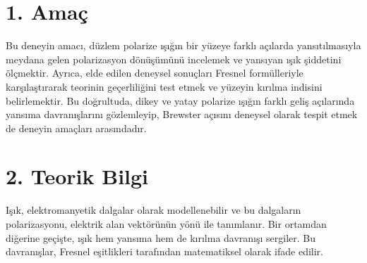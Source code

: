 \documentclass[11pt,letterpaper,twocolumn]{fenbil}
\begin{document}

\section*{1. Amaç}
Bu deneyin amacı, düzlem polarize ışığın bir yüzeye farklı açılarda yansıtılmasıyla meydana gelen polarizasyon dönüşümünü incelemek ve yansıyan ışık şiddetini ölçmektir. Ayrıca, elde edilen deneysel sonuçları Fresnel formülleriyle karşılaştırarak teorinin geçerliliğini test etmek ve yüzeyin kırılma indisini belirlemektir. Bu doğrultuda, dikey ve yatay polarize ışığın farklı geliş açılarında yansıma davranışlarını gözlemleyip, Brewster açısını deneysel olarak tespit etmek de deneyin amaçları arasındadır.

\section*{2. Teorik Bilgi}
Işık, elektromanyetik dalgalar olarak modellenebilir ve bu dalgaların polarizasyonu, elektrik alan vektörünün yönü ile tanımlanır. Bir ortamdan diğerine geçişte, ışık hem yansıma hem de kırılma davranışı sergiler. Bu davranışlar, Fresnel eşitlikleri tarafından matematiksel olarak ifade edilir.
\end{document}
